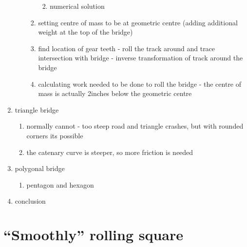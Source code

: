 \documentclass[12pt]{article}
\begin{document}
\begin{enumerate}
\begin{enumerate}
\begin{enumerate}
\begin{enumerate}
\begin{itemize}
                        \end{itemize}
                        \item numerical solution
                    \end{enumerate}
                    \item setting centre of mass to be at geometric centre (adding additional weight at the top of the bridge)
                    \item find location of gear teeth - roll the track around and trace intersection with bridge - inverse transformation of track around the bridge
                    \item calculating work needed to be done to roll the bridge - the centre of mass is actually 2inches below the geometric centre
                \end{enumerate}
            \end{enumerate}
            \item triangle bridge \begin{enumerate}
                \item normally cannot - too steep road and triangle crashes, but with rounded corners its possible
                \item the catenary curve is steeper, so more friction is needed
            \end{enumerate}
            \item polygonal bridge \begin{enumerate}
                \item pentagon and hexagon
            \end{enumerate}
            \item conclusion
        \end{enumerate}

    \section{``Smoothly'' rolling square}

        
    
    
    
    
        
\end{document}
